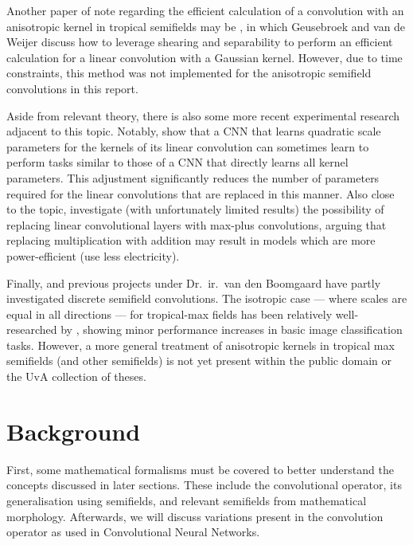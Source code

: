 \documentclass[a4paper, 12pt]{report}
\begin{document}
Another paper of note regarding the efficient calculation of a convolution with an anisotropic kernel in tropical semifields may be \cite{fastanifilter}, in which Geusebroek and van de Weijer discuss how to leverage shearing and separability to perform an efficient calculation for a linear convolution with a Gaussian kernel. However, due to time constraints, this method was not implemented for the anisotropic semifield convolutions in this report.

Aside from relevant theory, there is also some more recent experimental research adjacent to this topic. Notably, \cite{qlin1, qlin2} show that a CNN that learns quadratic scale parameters for the kernels of its linear convolution can sometimes learn to perform tasks similar to those of a CNN that directly learns all kernel parameters. This adjustment significantly reduces the number of parameters required for the linear convolutions that are replaced in this manner. Also close to the topic, \cite{fan2021alternative} investigate (with unfortunately limited results) the possibility of replacing linear convolutional layers with max-plus convolutions, arguing that replacing multiplication with addition may result in models which are more power-efficient (use less electricity).

Finally, \cite{groenendijk2022morphpool} and previous projects under Dr.\ ir.\ van den Boomgaard have partly investigated discrete semifield convolutions. The isotropic case --- where scales are equal in all directions --- for tropical-max fields has been relatively well-researched by \cite{thierrybsc, koenbsc}, showing minor performance increases in basic image classification tasks. However, a more general treatment of anisotropic kernels in tropical max semifields (and other semifields) is not yet present within the public domain or the UvA collection of theses.

\chapter{Background}
First, some mathematical formalisms must be covered to better understand the concepts discussed in later sections. These include the convolutional operator, its generalisation using semifields, and relevant semifields from mathematical morphology. Afterwards, we will discuss variations present in the convolution operator as used in Convolutional Neural Networks.
\end{document}
